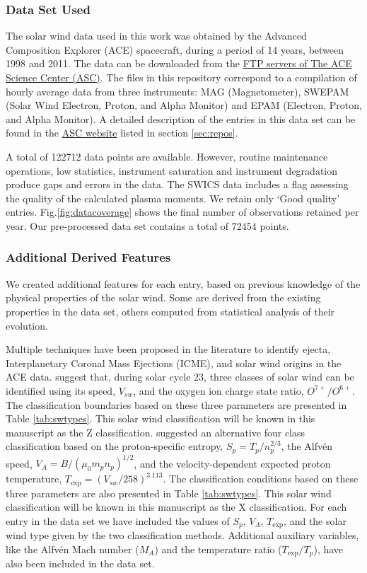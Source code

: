 \subsubsection{Data Set Used}
The solar wind data used in this work was obtained by the Advanced Composition Explorer (ACE) spacecraft, during a period of 14 years, between 1998 and 2011. The data can be downloaded from the \href{ftp://mussel.srl.caltech.edu/pub/ace/level2/multi}{FTP servers of The ACE Science Center (ASC)}. The files in this repository correspond to a compilation of hourly average data from three instruments: MAG (Magnetometer), SWEPAM (Solar Wind Electron, Proton, and Alpha Monitor) and EPAM (Electron, Proton, and Alpha Monitor). A detailed description of the entries in this data set can be found in the \href{http://www.srl.caltech.edu/cgi-bin/dib/rundibviewmultil2/ACE/ASC/DATA/level2/multi}{ASC website} listed in section \ref{sec:repos}.

A total of 122712 data points are available. However, routine maintenance operations, low statistics, instrument saturation and instrument degradation produce gaps and errors in the data. The SWICS data includes a flag assessing the quality of the calculated plasma moments. We retain only `Good quality' entries. Fig.\ref{fig:datacoverage} shows the final number of observations retained per year. Our pre-processed data set contains a total of 72454 points.

\subsubsection{Additional Derived Features}
We created additional features for each entry, based on previous knowledge of the physical properties of the solar wind. Some are derived from the existing properties in the data set, others computed from statistical analysis of their evolution.

Multiple techniques have been proposed in the literature to identify ejecta, Interplanetary Coronal Mass Ejections (ICME), and solar wind origins in the ACE data. \citep{Zhao2009} suggest that, during solar cycle 23, three classes of solar wind can be identified using its speed, $V_{sw}$, and the oxygen ion charge state ratio, $O^{7+}/O^{6+}$. The classification boundaries based on these three parameters are presented in Table \ref{tab:swtypes}. This solar wind classification will be known in this manuscript as the Z classification.
\citep{Xu2015b} suggested an alternative four class classification based on the proton-specific entropy, $S_p = T_p/n_p^{2/3}$, the Alfv\'en speed, $V_A = B / (\mu_0 m_p n_p)^{1/2}$, and the velocity-dependent expected proton temperature, $T_\text{exp} = (V_{sw}/258)^{3.113}$. The classification conditions based on these three parameters are also presented in Table \ref{tab:swtypes}. This solar wind classification will be known in this manuscript as the X classification\citep{Xu2015b}. For each entry in the data set we have included the values of $S_p$, $V_A$, $T_\text{exp}$, and the solar wind type given by the two classification methods. Additional auxiliary variables, like the Alfv\'en Mach number ($M_A$) and the temperature ratio ($T_\text{exp}/T_p$), have also been included in the data set.

